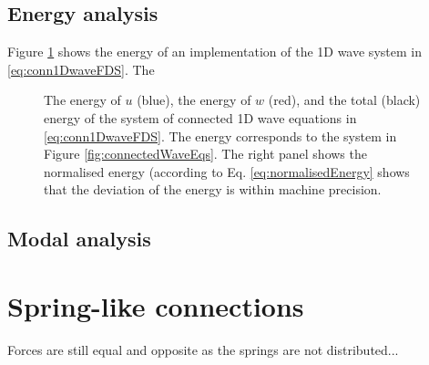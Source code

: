 \subsection{Energy analysis}
Figure \ref{fig:energyConn1DWave} shows the energy of an implementation of the 1D wave system in \eqref{eq:conn1DwaveFDS}.  The 
\begin{figure}[h]
    \centering
      \caption{The energy of $u$ (blue), the energy of $w$ (red), and the total (black) energy of the system of connected 1D wave equations in \eqref{eq:conn1DwaveFDS}. The energy corresponds to the system in Figure \ref{fig:connectedWaveEqs}. The right panel shows the normalised energy (according to Eq. \eqref{eq:normalisedEnergy} shows that the deviation of the energy is within machine precision. \label{fig:energyConn1DWave}}
\end{figure}

\subsection{Modal analysis}


\section{Spring-like connections}

Forces are still equal and opposite as the springs are not distributed...

